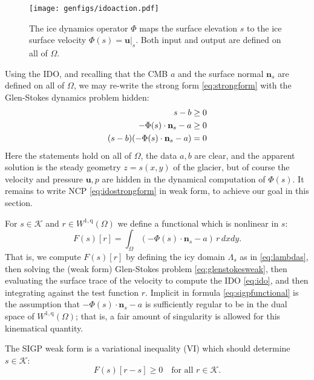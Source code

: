 \documentclass[letterpaper,final,12pt,reqno]{amsart}
\theoremstyle{claim}
\newcommand{\bn}{\mathbf{n}}
\newcommand{\bu}{\mathbf{u}}
\newcommand{\qq}{{\text{q}}}
\numberwithin{equation}{section}
\numberwithin{figure}{section}
\numberwithin{table}{section}
\numberwithin{theorem}{section}
\begin{document}
\begin{figure}[ht]
\begin{center}
\texttt{[image: genfigs/idoaction.pdf]}
\end{center}
\caption{The ice dynamics operator $\Phi$ maps the surface elevation $s$ to the ice surface velocity $\Phi(s)=\bu|_s$.  Both input and output are defined on all of $\Omega$.}
\label{fig:idoaction}
\end{figure}

Using the IDO, and recalling that the CMB $a$ and the surface normal $\bn_s$ are defined on all of $\Omega$, we may re-write the strong form \eqref{eq:strongform} with the Glen-Stokes dynamics problem hidden:
\begin{align}
s - b &\ge 0  \label{eq:idostrongform} \\
- \Phi(s) \cdot \bn_s - a &\ge 0 \notag \\
(s - b) (- \Phi(s) \cdot \bn_s - a) &= 0 \notag
\end{align}
Here the statements hold on all of $\Omega$, the data $a,b$ are clear, and the apparent solution is the steady geometry $z=s(x,y)$ of the glacier, but of course the velocity and pressure $\bu,p$ are hidden in the dynamical computation of $\Phi(s)$.  It remains to write NCP \eqref{eq:idostrongform} in weak form, to achieve our goal in this section.

For $s \in \mathcal{K}$ and $r \in W^{1,\qq}(\Omega)$ we define a functional which is nonlinear in $s$:
\begin{equation}
F(s)[r] = \int_\Omega (- \Phi(s) \cdot \bn_s - a)\, r \,dx dy. \label{eq:sigpfunctional}
\end{equation}
That is, we compute $F(s)[r]$ by defining the icy domain $\Lambda_s$ as in \eqref{eq:lambdas}, then solving the (weak form) Glen-Stokes problem \eqref{eq:glenstokesweak}, then evaluating the surface trace of the velocity to compute the IDO \eqref{eq:ido}, and then integrating against the test function $r$.  Implicit in formula \eqref{eq:sigpfunctional} is the assumption that $- \Phi(s) \cdot \bn_s - a$ is sufficiently regular to be in the dual space of $W^{1,\qq}(\Omega)$; that is, a fair amount of singularity is allowed for this kinematical quantity.

The SIGP weak form is a variational inequality (VI) \cite{KinderlehrerStampacchia1980} which should determine $s\in\mathcal{K}$:
\begin{equation}
F(s)[r - s] \ge 0 \quad \text{for all $r \in \mathcal{K}$.}  \label{eq:sigpweakform}
\end{equation}
\end{document}
